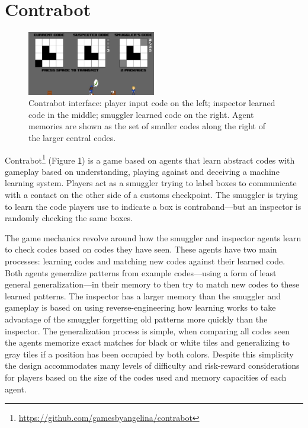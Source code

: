 \documentclass{sig-alternate}
\begin{document}
\section{Contrabot}

\begin{figure}[tb]
\centering
\includegraphics[width=0.5\textwidth]{images/contrabot}
\caption{{\sc Contrabot} interface: player input code on the left; inspector learned code in the middle; smuggler learned code on the right. Agent memories are shown as the set of smaller codes along the right of the larger central codes.}
\label{fig:contrabot}
\end{figure}

{\sc Contrabot}\footnote{\url{https://github.com/gamesbyangelina/contrabot}} (Figure \ref{fig:contrabot}) is a game based on agents that learn abstract codes with gameplay based on understanding, playing against and deceiving a machine learning system.
%
Players act as a smuggler trying to label boxes to communicate with a contact on the other side of a customs checkpoint.
The smuggler is trying to learn the code players use to indicate a box is contraband---but an inspector is randomly checking the same boxes.

The game mechanics revolve around how the smuggler and inspector agents learn to check codes based on codes they have seen.
These agents have two main processes: learning codes and matching new codes against their learned code.
Both agents generalize patterns from example codes---using a form of least general generalization---in their memory to then try to match new codes to these learned patterns.
The inspector has a larger memory than the smuggler and gameplay is based on using reverse-engineering how learning works to take advantage of the smuggler forgetting old patterns more quickly than the inspector.
%
The generalization process is simple, when comparing all codes seen the agents memorize exact matches for black or white tiles and generalizing to gray tiles if a position has been occupied by both colors.
Despite this simplicity the design accommodates many levels of difficulty and risk-reward considerations for players based on the size of the codes used and memory capacities of each agent.
\end{document}
